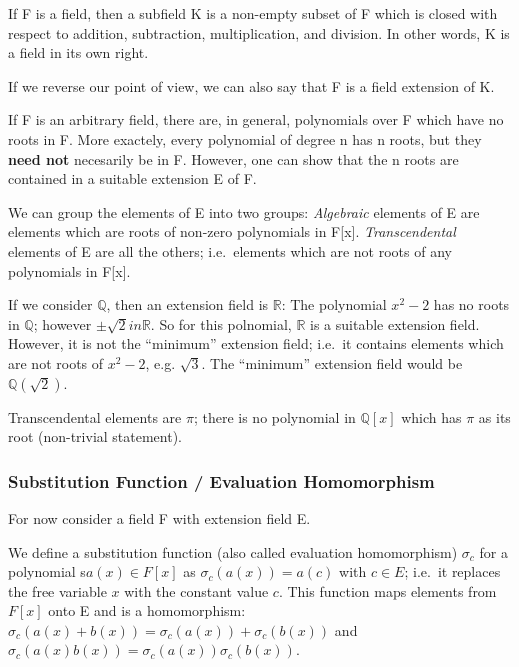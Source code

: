 
If F is a field, then a subfield K is a non-empty subset of F which is
closed with respect to addition, subtraction, multiplication, and
division. In other words, K is a field in its own right.

If we reverse our point of view, we can also say that F is a field
extension of K.

If F is an arbitrary field, there are, in general, polynomials over F
which have no roots in F. More exactely, every polynomial of degree n
has n roots, but they \textbf{need not} necesarily be in F. However, one
can show that the n roots are contained in a suitable extension E of F.

We can group the elements of E into two groups: \emph{Algebraic}
elements of E are elements which are roots of non-zero polynomials in
F{[}x{]}. \emph{Transcendental} elements of E are all the others;
i.e.~elements which are not roots of any polynomials in F{[}x{]}.

If we consider \(\mathbb{Q}\), then an extension field is
\(\mathbb{R}\): The polynomial \(x^2-2\) has no roots in \(\mathbb{Q}\);
however \(\pm \sqrt{2} in \mathbb{R}\). So for this polnomial,
\(\mathbb{R}\) is a suitable extension field. However, it is not the
``minimum'' extension field; i.e.~it contains elements which are not
roots of \(x^2-2\), e.g. \(\sqrt{3}\). The ``minimum'' extension field
would be \(\mathbb{Q}(\sqrt{2})\).

Transcendental elements are \(\pi\); there is no polynomial in
\(\mathbb{Q}[x]\) which has \(\pi\) as its root (non-trivial statement).

\subsubsection{Substitution Function / Evaluation
Homomorphism}\label{substitution-function-evaluation-homomorphism}

For now consider a field F with extension field E.

We define a substitution function (also called evaluation homomorphism)
\(\sigma_c\) for a polynomial s\(a(x) \in F[x]\) as
\(\sigma_c(a(x)) = a(c)\) with \(c \in E\); i.e.~it replaces the free
variable \(x\) with the constant value \(c\). This function maps
elements from \(F[x]\) onto E and is a homomorphism:
\(\sigma_c(a(x) + b(x)) = \sigma_c(a(x)) + \sigma_c(b(x))\) and
\(\sigma_c(a(x)b(x)) = \sigma_c(a(x)) \sigma_c(b(x))\).

